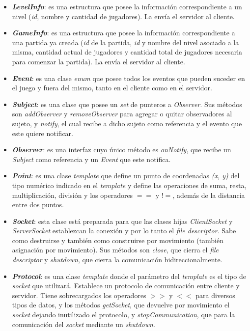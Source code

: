 \begin{itemize}
	\item \textbf{\textit{LevelInfo}}: es una estructura que posee la información correspondiente a un nivel (\textit{id}, nombre y cantidad de jugadores). La envía el servidor al cliente.
	
	\item \textbf{\textit{GameInfo}}: es una estructura que posee la información correspondiente a una partida ya creada (\textit{id} de la partida, \textit{id} y nombre del nivel asociado a la misma, cantidad actual de jugadores y cantidad total de jugadores necesaria para comenzar la partida). La envía el servidor al cliente.
	
	\item \textbf{\textit{Event}}: es una clase \textit{enum} que posee todos los eventos que pueden suceder en el juego y fuera del mismo, tanto en el cliente como en el servidor.
	
	\item \textbf{\textit{Subject}}: es una clase que posee un \textit{set} de punteros a \textit{Observer}. Sus métodos son \textit{addObserver} y \textit{removeObserver} para agregar o quitar observadores al sujeto, y \textit{notify}, el cual recibe a dicho sujeto como referencia y el evento que este quiere notificar.
	
	\item \textbf{\textit{Observer}}: es una interfaz cuyo único método es \textit{onNotify}, que recibe un \textit{Subject} como referencia y un \textit{Event} que este notifica.
	
	\item \textbf{\textit{Point}}: es una clase \textit{template} que define un punto de coordenadas \textit{(x, y)} del tipo numérico indicado en el \textit{template} y define las operaciones de suma, resta, multiplicación, división y los operadores $==$ y  $!=$, además de la distancia entre dos puntos.
	
	\item \textbf{\textit{Socket}}: esta clase está preparada para que las clases hijas  \textit{ClientSocket} y \textit{ServerSocket} establezcan la conexión y por lo tanto el \textit{file descriptor}. Sabe como destruirse y también como construirse por movimiento (también asignación por movimiento). Sus métodos son \textit{close}, que cierra el \textit{file descriptor} y \textit{shutdown}, que cierra la comunicación bidireccionalmente.
	
	\item \textbf{\textit{Protocol}}: es una clase \textit{template} donde el parámetro del \textit{template} es el tipo de \textit{socket} que utilizará. Establece un protocolo de comunicación entre cliente y servidor. Tiene sobrecargados los operadores $>>$ y $<<$ para diversos tipos de datos, y los métodos \textit{getSocket}, que devuelve por movimiento el \textit{socket} dejando inutilizado el protocolo, y \textit{stopCommunication}, que para la comunicación del \textit{socket} mediante un \textit{shutdown}.
	

\end{itemize}
